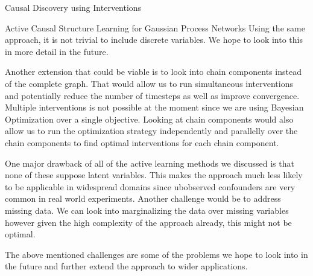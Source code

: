 \documentclass[10pt]{article}
\begin{document}
\begin{psection}[4]{Causal Discovery using Interventions}
\begin{psubsection}{Active Causal Structure Learning for Gaussian Process Networks}
        Using the same approach, it is not trivial to include discrete variables. We
        hope to look into this in more detail in the future.

        Another extension that could be viable is to look into chain components instead
        of the complete graph. That would allow us to run simultaneous interventions and
        potentially reduce the number of timesteps as well as improve convergence.
        Multiple interventions is not possible at the moment since we are using Bayesian
        Optimization over a single objective. Looking at chain components would also
        allow us to run the optimization strategy independently and parallelly over
        the chain components to find optimal interventions for each chain component.

        One major drawback of all of the active learning methods we discussed is that
        none of these suppose latent variables. This makes the approach much less
        likely to be applicable in widespread domains since ubobserved confounders are
        very common in real world experiments. Another challenge would be to address
        missing data. We can look into marginalizing the data over missing variables
        however given the high complexity of the approach already, this might not be
        optimal.

        The above mentioned challenges are some of the problems we hope to look into in
        the future and further extend the approach to wider applications.
    
    \end{psubsection}

\end{psection}



\end{document}
